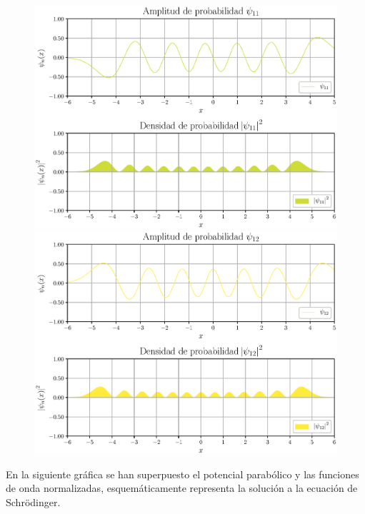 \begin{figure}[H]
    \centering
    \includegraphics[scale=0.6]{Imagenes/Funcion_Onda_011.eps}
    \includegraphics[scale=0.6]{Imagenes/Funcion_Onda_012.eps}
\end{figure}
\newpage
En la siguiente gráfica se han superpuesto el potencial parabólico y las funciones de onda normalizadas, esquemáticamente representa la solución a la ecuación de Schrödinger.
